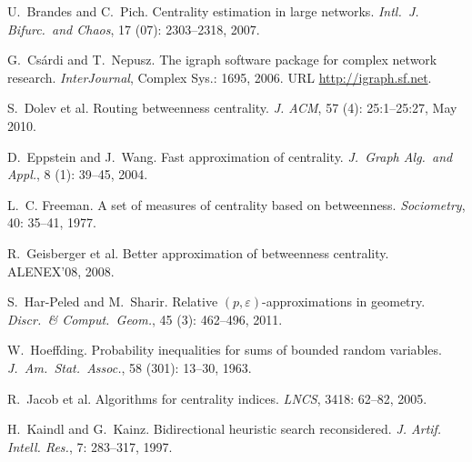 \begin{thebibliography}{35}
U.~Brandes and C.~Pich.
\newblock Centrality estimation in large networks.
\newblock \emph{Intl.~J. Bifurc.~and Chaos}, 17 (07):
2303--2318, 2007.

G.~Cs\'{a}rdi and T.~Nepusz.
\newblock The igraph software package for complex network research.
\newblock \emph{InterJournal}, Complex Sys.: 1695, 2006.
\newblock URL \url{http://igraph.sf.net}.

S.~Dolev et al.
\newblock Routing betweenness centrality.
\newblock \emph{J. ACM}, 57 (4): 25:1--25:27, May 2010.

D.~Eppstein and J.~Wang.
\newblock Fast approximation of centrality.
\newblock \emph{J.~Graph Alg.~and Appl.}, 8
  (1): 39--45, 2004.

L.~C. Freeman.
\newblock A set of measures of centrality based on betweenness.
\newblock \emph{Sociometry}, 40: 35--41, 1977.

R.~Geisberger et al.
\newblock Better approximation of betweenness centrality.
\newblock ALENEX'08, 2008.

S.~Har-Peled and M.~Sharir.
\newblock Relative $(p,\varepsilon)$-approximations in geometry.
\newblock \emph{Discr.~\& Comput.~Geom.}, 45 (3):
  462--496, 2011.

W.~Hoeffding.
\newblock Probability inequalities for sums of bounded random variables.
\newblock \emph{J.~Am.~Stat.~Assoc.}, 58
  (301): 13--30, 1963.

R.~Jacob et al.
\newblock Algorithms for centrality indices.
\newblock \emph{LNCS}, 3418: 62--82, 2005.

H.~Kaindl and G.~Kainz.
\newblock Bidirectional heuristic search reconsidered.
\newblock \emph{J. Artif. Intell. Res.}, 7: 283--317, 1997.


\end{thebibliography}
